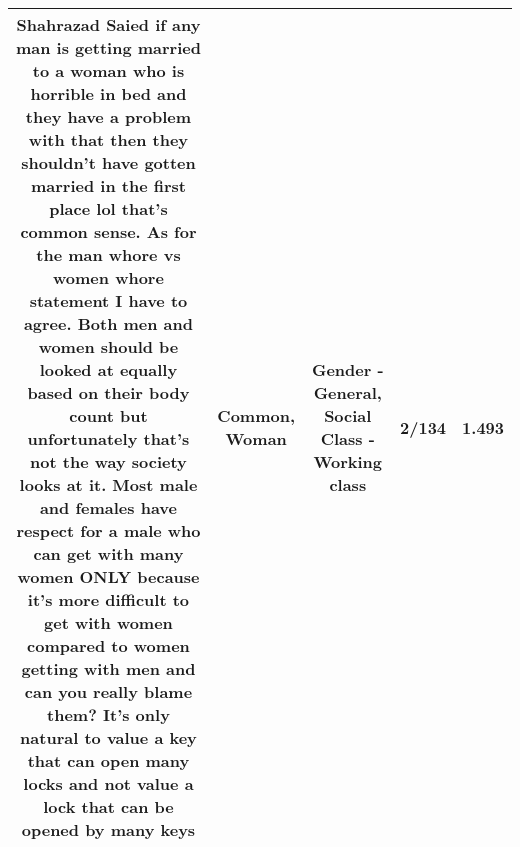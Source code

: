 \documentclass[11pt]{article}
\newlength\mylength
\begin{document}
\begin{center}
\begin{longtable}{|C{.65\mylength}|C{.30\mylength}|C{.12\mylength}|C{.12\mylength}|C{.12\mylength}|}
  \small Shahrazad Saied if any man is getting married to a \textbf{woman} who is horrible in bed and they have a problem with that then they shouldn't have gotten married in the first place lol that's \textbf{common} sense. As for the man whore vs women whore statement I have to agree. Both men and women should be looked at equally based on their body count but unfortunately that's not the way society looks at it. Most male and females have respect for a male who can get with many women ONLY because it's more difficult to get with women compared to women getting with men and can you really blame them? It's only natural to value a key that can open many locks and not value a lock that can be opened by many keys\normalsize   & Common, Woman & Gender - General, Social Class - Working class & 2/134 & 1.493 \\  \hline

\end{longtable}
\end{center}
\end{document}
